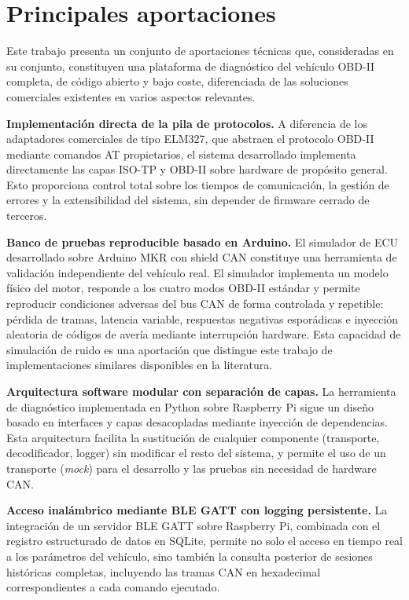 \section{Principales aportaciones}

Este trabajo presenta un conjunto de aportaciones técnicas que, consideradas en su conjunto, constituyen una plataforma de diagnóstico del vehículo OBD-II completa, de código abierto y bajo coste, diferenciada de las soluciones comerciales existentes en varios aspectos relevantes.

\textbf{Implementación directa de la pila de protocolos.} A diferencia de los adaptadores comerciales de tipo ELM327, que abstraen el protocolo OBD-II mediante comandos AT propietarios, el sistema desarrollado implementa directamente las capas ISO-TP y OBD-II sobre hardware de propósito general. Esto proporciona control total sobre los tiempos de comunicación, la gestión de errores y la extensibilidad del sistema, sin depender de firmware cerrado de terceros.

\textbf{Banco de pruebas reproducible basado en Arduino.} El simulador de ECU desarrollado sobre Arduino MKR con shield CAN constituye una herramienta de validación independiente del vehículo real. El simulador implementa un modelo físico del motor, responde a los cuatro modos OBD-II estándar y permite reproducir condiciones adversas del bus CAN de forma controlada y repetible: pérdida de tramas, latencia variable, respuestas negativas esporádicas e inyección aleatoria de códigos de avería mediante interrupción hardware. Esta capacidad de simulación de ruido es una aportación que distingue este trabajo de implementaciones similares disponibles en la literatura.

\textbf{Arquitectura software modular con separación de capas.} La herramienta de diagnóstico implementada en Python sobre Raspberry Pi sigue un diseño basado en interfaces y capas desacopladas mediante inyección de dependencias. Esta arquitectura facilita la sustitución de cualquier componente (transporte, decodificador, logger) sin modificar el resto del sistema, y permite el uso de un transporte  (\textit{mock}) para el desarrollo y las pruebas sin necesidad de hardware CAN.

\textbf{Acceso inalámbrico mediante BLE GATT con logging persistente.} La integración de un servidor BLE GATT sobre Raspberry Pi, combinada con el registro estructurado de datos en SQLite, permite no solo el acceso en tiempo real a los parámetros del vehículo, sino también la consulta posterior de sesiones históricas completas, incluyendo las tramas CAN en hexadecimal correspondientes a cada comando ejecutado.

